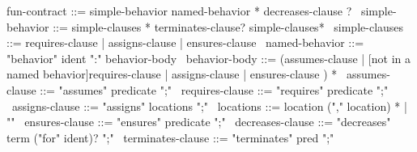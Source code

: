 \begin{syntax}
  fun-contract ::= simple-behavior named-behavior * decreases-clause ?
  \
  simple-behavior ::= simple-clauses * terminates-clause? simple-clauses*
  \
  simple-clauses ::= requires-clause | assigns-clause | ensures-clause
  \
  named-behavior ::= "behavior" ident ":" behavior-body
  \
  behavior-body ::= (assumes-clause |
                     {[not in a named behavior]requires-clause}
                    | assigns-clause |
                      ensures-clause ) *
              \
  assumes-clause ::= "assumes" predicate ";"
  \
  requires-clause ::= "requires" predicate ";"
  \
  assigns-clause ::= "assigns" locations ";"
  \
  locations ::= location ("," location) * | "\nothing"
  \
  ensures-clause ::= "ensures" predicate ";"
  \
  decreases-clause ::= "decreases" term ("for" ident)? ";"
  \
  terminates-clause ::= "terminates" pred ";"
\end{syntax}
